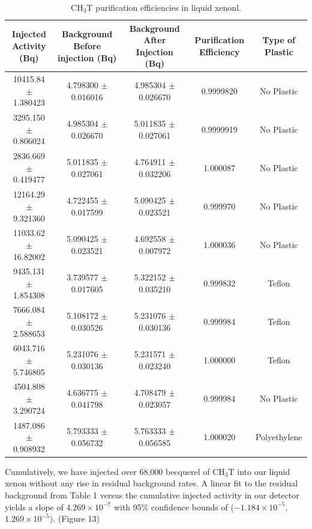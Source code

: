 \documentclass[a4paper,12pt]{article}
\begin{document}
\begin{table}
\centering
\caption{CH$_3$T purification efficiencies in liquid xenonl.}
\begin{tabular}{ c | c | c | c | c }
Injected Activity (Bq) & Background Before injection (Bq) & Background After Injection (Bq) & Purification Efficiency & Type of Plastic \\
\hline
10415.84 $\pm$ 1.380423 & 4.798300 $\pm$ 0.016016 & 4.985304 $\pm$ 0.026670 & 0.9999820 & No Plastic \\
3295.150 $\pm$ 0.806024 & 4.985304 $\pm$ 0.026670 & 5.011835 $\pm$ 0.027061 & 0.9999919 & No Plastic \\
2836.669 $\pm$ 0.419477 & 5.011835 $\pm$ 0.027061 & 4.764911 $\pm$ 0.032206 & 1.000087 & No Plastic \\
12164.29 $\pm$ 9.321360 & 4.722455 $\pm$ 0.017599 & 5.090425 $\pm$ 0.023521 & 0.999970 & No Plastic \\
11033.62 $\pm$ 16.82002 & 5.090425 $\pm$ 0.023521 & 4.692558 $\pm$ 0.007972 & 1.000036 & No Plastic \\
9435.131 $\pm$ 1.854308 & 3.739577 $\pm$ 0.017605 & 5.322152 $\pm$ 0.035210 & 0.999832 & Teflon \\
7666.084 $\pm$ 2.588653 & 5.108172 $\pm$ 0.030526 & 5.231076 $\pm$ 0.030136 & 0.999984 & Teflon \\
6043.716 $\pm$ 5.746805 & 5.231076 $\pm$ 0.030136 & 5.231571 $\pm$ 0.023240 & 1.000000 & Teflon \\
4504.808 $\pm$ 3.290724 & 4.636775 $\pm$ 0.041798 & 4.708479 $\pm$ 0.023057 & 0.999984 & No Plastic \\
1487.086 $\pm$ 0.908932 & 5.793333 $\pm$ 0.056732 & 5.763333 $\pm$ 0.056585 & 1.000020 & Polyethylene \\
\end{tabular}
\end{table}





Cumulatively, we have injected over 68,000 becquerel of CH$_3$T into our liquid xenon without any rise in residual background rates.  A linear fit to the residual background from Table 1 versus the cumulative injected activity in our detector yields a slope of $4.269 \times 10^{-7}$ with 95\% confidence bounds of ($-1.184 \times 10^{-5}$, $1.269 \times 10^{-5}$). (Figure 13)
\end{document}

